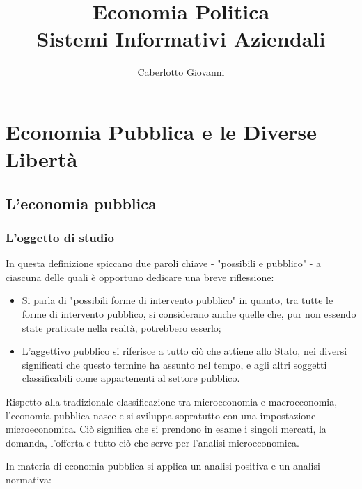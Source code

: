 \documentclass{report}
\title{\Huge{Economia Politica}\\Sistemi Informativi Aziendali}
\author{\huge{Caberlotto Giovanni}}
\date{}
\begin{document}
\maketitle
\newpage%
\tableofcontents
\pagebreak

\chapter{Economia Pubblica e le Diverse Libertà} %

\label{chap:Economia Pubblica e le Diverse Libertà}

\section{L'economia pubblica}

\subsection{L'oggetto di studio}


In questa definizione spiccano due paroli chiave - "possibili e pubblico" - a ciascuna delle quali è opportuno dedicare una breve riflessione:
\begin{itemize}
  \item Si parla di "possibili forme di intervento pubblico" in quanto, tra tutte le forme di intervento pubblico, si considerano anche quelle che, pur non essendo state praticate nella realtà, potrebbero esserlo;
  \item L'aggettivo pubblico si riferisce a tutto ciò che attiene allo Stato, nei diversi significati che questo termine ha assunto nel tempo, e agli altri soggetti classificabili come appartenenti al settore pubblico.
\end{itemize}

Rispetto alla tradizionale classificazione tra microeconomia e macroeconomia, l'economia pubblica nasce e si sviluppa sopratutto con una impostazione microeconomica.
Ciò significa che si prendono in esame i singoli mercati, la domanda, l'offerta e tutto ciò che serve per l'analisi microeconomica.

In materia di economia pubblica si applica un analisi positiva e un analisi normativa:
\end{document}
